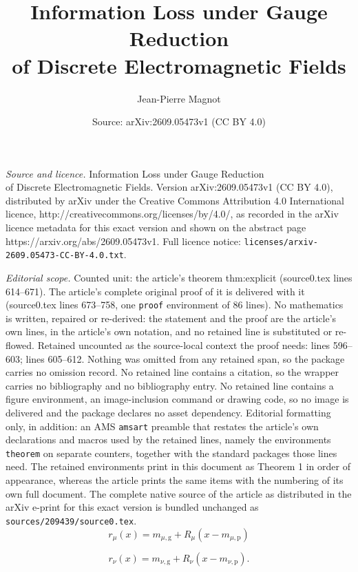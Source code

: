 \documentclass[10pt,a4paper]{amsart}
\title{Information Loss under Gauge Reduction\\ of Discrete Electromagnetic Fields}
\author{Jean-Pierre Magnot}
\date{Source: arXiv:2609.05473v1 (CC BY 4.0)}
\begin{document}
\maketitle

\noindent\emph{Source and licence.} Information Loss under Gauge Reduction\\ of Discrete Electromagnetic Fields. Version arXiv:2609.05473v1 (CC BY 4.0), distributed by arXiv under the Creative Commons Attribution 4.0 International licence, http://creativecommons.org/licenses/by/4.0/, as recorded in the arXiv licence metadata for this exact version and shown on the abstract page https://arxiv.org/abs/2609.05473v1. Full licence notice: \texttt{licenses/arxiv-2609.05473-CC-BY-4.0.txt}.\par\smallskip

\noindent\textit{Editorial scope.} Counted unit: the article's theorem thm:explicit (source0.tex lines 614--671). The article's complete original proof of it is delivered with it (source0.tex lines 673--758, one \texttt{proof} environment of 86 lines). No mathematics is written, repaired or re-derived: the statement and the proof are the article's own lines, in the article's own notation, and no retained line is substituted or re-flowed.  Retained uncounted as the source-local context the proof needs: lines 596--603; lines 605--612.  Nothing was omitted from any retained span, so the package carries no omission record.  No retained line contains a citation, so the wrapper carries no bibliography and no bibliography entry.  No retained line contains a figure environment, an image-inclusion command or drawing code, so no image is delivered and the package declares no asset dependency.  Editorial formatting only, in addition: an AMS \texttt{amsart} preamble that restates the article's own declarations and macros used by the retained lines, namely the environments \texttt{theorem} on separate counters, together with the standard packages those lines need.  The retained environments print in this document as Theorem 1 in order of appearance, whereas the article prints the same items with the numbering of its own full document.  The complete native source of the article as distributed in the arXiv e-print for this exact version is bundled unchanged as \texttt{sources/209439/source0.tex}.
\begin{equation}
r_\mu(x)
=
m_{\mu,\mathrm g}
+
R_\mu(x-m_{\mu,\mathrm p})
\label{eq:rmu}
\end{equation}

\begin{equation}
r_\nu(x)
=
m_{\nu,\mathrm g}
+
R_\nu(x-m_{\nu,\mathrm p}).
\label{eq:rnu}
\end{equation}
\end{document}
